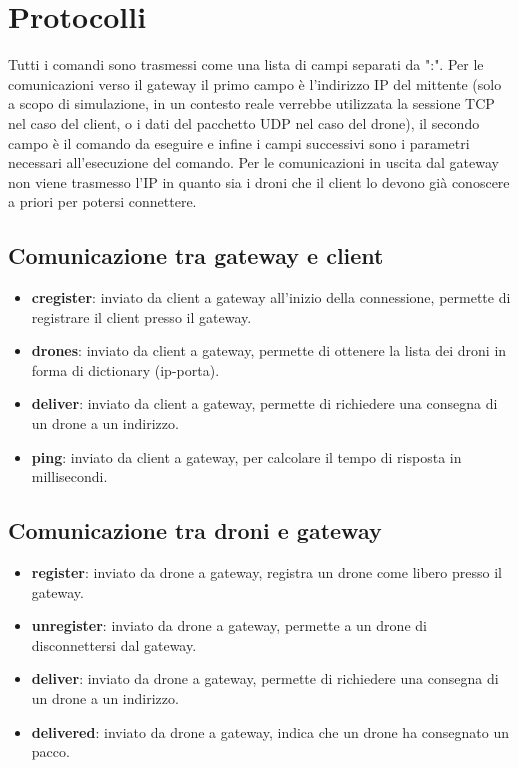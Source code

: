 \documentclass[a4paper,12pt]{report}
\begin{document}
\chapter{Protocolli}
Tutti i comandi sono trasmessi come una lista di campi separati da ":". 
Per le comunicazioni verso il gateway il primo campo è l'indirizzo IP del mittente (solo a scopo di simulazione, in un contesto reale verrebbe utilizzata la sessione TCP 
nel caso del client, o i dati del pacchetto UDP nel caso del drone), il secondo campo è il comando da eseguire e infine i campi successivi sono i parametri necessari 
all'esecuzione del comando.
Per le comunicazioni in uscita dal gateway non viene trasmesso l'IP in quanto sia i droni che il client lo devono già conoscere a priori per potersi connettere.
\section{Comunicazione tra gateway e client}
\begin{itemize}
    \item \textbf{cregister}: inviato da client a gateway all'inizio della connessione, permette di registrare il client presso il gateway.
    \item \textbf{drones}: inviato da client a gateway, permette di ottenere la lista dei droni in forma di dictionary (ip-porta).
    \item \textbf{deliver}: inviato da client a gateway, permette di richiedere una consegna di un drone a un indirizzo.
    \item \textbf{ping}: inviato da client a gateway, per calcolare il tempo di risposta in millisecondi.
\end{itemize}
\section{Comunicazione tra droni e gateway}
\begin{itemize}
    \item \textbf{register}: inviato da drone a gateway, registra un drone come libero presso il gateway.
    \item \textbf{unregister}: inviato da drone a gateway, permette a un drone di disconnettersi dal gateway.
    \item \textbf{deliver}: inviato da drone a gateway, permette di richiedere una consegna di un drone a un indirizzo.
    \item \textbf{delivered}: inviato da drone a gateway, indica che un drone ha consegnato un pacco.
\end{itemize}
\end{document}
